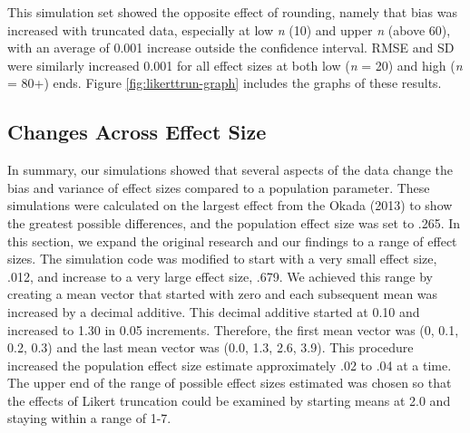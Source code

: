 \documentclass[english,man]{apa6}
\theoremstyle{definition}
\theoremstyle{definition}
\theoremstyle{definition}
\theoremstyle{remark}
\begin{document}
This simulation set showed the opposite effect of rounding, namely that
bias was increased with truncated data, especially at low \emph{n} (10)
and upper \emph{n} (above 60), with an average of 0.001 increase outside
the confidence interval. RMSE and SD were similarly increased 0.001 for
all effect sizes at both low (\emph{n} = 20) and high (\emph{n} = 80+)
ends. Figure \ref{fig:likerttrun-graph} includes the graphs of these
results.

\subsection{Changes Across Effect
Size}\label{changes-across-effect-size}

In summary, our simulations showed that several aspects of the data
change the bias and variance of effect sizes compared to a population
parameter. These simulations were calculated on the largest effect from
the Okada (2013) to show the greatest possible differences, and the
population effect size was set to .265. In this section, we expand the
original research and our findings to a range of effect sizes. The
simulation code was modified to start with a very small effect size,
.012, and increase to a very large effect size, .679. We achieved this
range by creating a mean vector that started with zero and each
subsequent mean was increased by a decimal additive. This decimal
additive started at 0.10 and increased to 1.30 in 0.05 increments.
Therefore, the first mean vector was (0, 0.1, 0.2, 0.3) and the last
mean vector was (0.0, 1.3, 2.6, 3.9). This procedure increased the
population effect size estimate approximately .02 to .04 at a time. The
upper end of the range of possible effect sizes estimated was chosen so
that the effects of Likert truncation could be examined by starting
means at 2.0 and staying within a range of 1-7.
\end{document}
